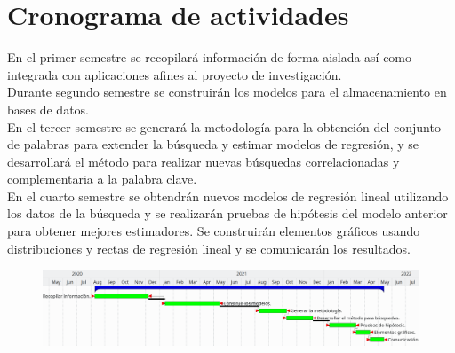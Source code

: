 \section {Cronograma de actividades}
En el primer semestre se recopilará información de forma aislada así como integrada con aplicaciones afines al proyecto de investigación.\\
Durante segundo semestre se construirán los modelos para el almacenamiento en bases de datos.\\
En el tercer semestre se generará la metodología para la obtención del conjunto de palabras para extender la búsqueda y estimar modelos de regresión, y se desarrollará el método para realizar nuevas búsquedas correlacionadas y complementaria a la palabra clave.\\
En el cuarto semestre se obtendrán nuevos modelos de regresión lineal utilizando los datos de la búsqueda y se realizarán pruebas de hipótesis del modelo anterior para obtener mejores estimadores. Se construirán elementos gráficos usando distribuciones y rectas de regresión lineal y se comunicarán los resultados.
\begin{figure}[H]\centering\includegraphics[width=.95\linewidth]{gantt.png}\end{figure}